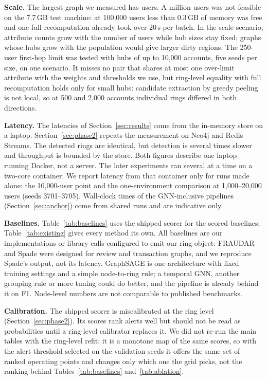 \textbf{Scale.} The largest graph we measured has \ScaleMaxUsers{} users. A
million users was not feasible on the 7.7\,GB test machine: at 100{,}000 users
less than 0.3\,GB of memory was free and one full recomputation already took
over 20\,s per batch. In the scale scenario, attribute counts grow with the
number of users while hub sizes stay fixed; graphs whose hubs grow with the
population would give larger dirty regions. The 250-user first-hop limit was
tested with hubs of up to 10,000 accounts, five seeds per size, on one scenario.
It misses no pair that shares at most one over-limit attribute with the
weights and thresholds we use, but ring-level equality with full recomputation
holds only for small hubs: candidate extraction by greedy peeling is not local,
so at 500 and 2,000 accounts individual rings differed in both directions.

\textbf{Latency.} The latencies of Section~\ref{sec:results} come from the
in-memory store on a laptop. Section~\ref{sec:phase2} repeats the measurement on
Neo4j and Redis Streams. The detected rings are identical, but detection is
several times slower and throughput is bounded by the store. Both figures
describe one laptop running Docker, not a server. The later experiments ran
several at a time on a two-core container. We report latency from that container
only for runs made alone: the 10{,}000-user point and the one-environment
comparison at 1{,}000--20{,}000 users (seeds 3701--3705). Wall-clock times of the
GNN-inclusive pipelines (Section~\ref{sec:anchor}) come from shared runs and are
indicative only.

\textbf{Baselines.} Table~\ref{tab:baselines} uses the shipped scorer for
the scored baselines; Table~\ref{tab:existing} gives every method its own. All
baselines are our implementations or library calls configured to emit our ring
object: FRAUDAR and Spade were designed for review and transaction graphs, and
we reproduce Spade's output, not its latency. GraphSAGE is one architecture with
fixed training settings and a simple node-to-ring rule; a temporal GNN, another
grouping rule or more tuning could do better, and the pipeline is already
behind it on F1. Node-level numbers are not comparable to published benchmarks.

\textbf{Calibration.} The shipped scorer is miscalibrated at the ring level
(Section~\ref{sec:phase2}). Its scores rank alerts well but should not be read
as probabilities until a ring-level calibrator replaces it. We did not re-run
the main tables with the ring-level refit: it is a monotone map of the same
scores, so with the alert threshold selected on the validation seeds it offers
the same set of ranked operating points and changes only which one the grid
picks, not the ranking behind Tables~\ref{tab:baselines}
and~\ref{tab:ablation}.

